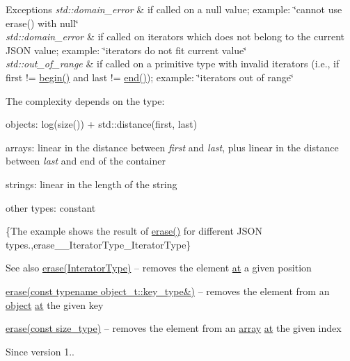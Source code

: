 \begin{DoxyExceptions}{Exceptions}
{\em std\+::domain\+\_\+error} & if called on a {\ttfamily null} value; example\+: {\ttfamily \char`\"{}cannot use
erase() with null\char`\"{}} \\
\hline
{\em std\+::domain\+\_\+error} & if called on iterators which does not belong to the current J\+S\+ON value; example\+: {\ttfamily \char`\"{}iterators do not fit current value\char`\"{}} \\
\hline
{\em std\+::out\+\_\+of\+\_\+range} & if called on a primitive type with invalid iterators (i.\+e., if {\ttfamily first != \hyperlink{a00025_ad4e381c54039607be08d7af41a1f6ad1}{begin()}} and {\ttfamily last != \hyperlink{a00025_a12ccf14d39ddae52f6c7e126105a230b}{end()}}); example\+: {\ttfamily \char`\"{}iterators out of range\char`\"{}}\\
\hline
\end{DoxyExceptions}
The complexity depends on the type\+:
\begin{DoxyItemize}
\item objects\+: {\ttfamily log(size()) + std\+::distance(first, last)}
\item arrays\+: linear in the distance between {\itshape first} and {\itshape last}, plus linear in the distance between {\itshape last} and end of the container
\item strings\+: linear in the length of the string
\item other types\+: constant
\end{DoxyItemize}

\{The example shows the result of {\ttfamily \hyperlink{a00025_a45e789042a23138eba2b69f34df9fc45}{erase()}} for different J\+S\+ON types.,erase\+\_\+\+\_\+\+Iterator\+Type\+\_\+\+Iterator\+Type\}

\begin{DoxySeeAlso}{See also}
\hyperlink{a00025_a45e789042a23138eba2b69f34df9fc45}{erase(\+Interator\+Type)} -- removes the element \hyperlink{a00025_a214a8c22d616fd3567b88932c07436c9}{at} a given position 

\hyperlink{a00025_aa36e72ffc3241b960fe9186d19e03bc3}{erase(const typename object\+\_\+t\+::key\+\_\+type\&)} -- removes the element from an \hyperlink{a00025_ad25b2f8c21e241e2d63455537a9294ff}{object} \hyperlink{a00025_a214a8c22d616fd3567b88932c07436c9}{at} the given key 

\hyperlink{a00025_a3da254c422ede5495f2815c5e48c00c5}{erase(const size\+\_\+type)} -- removes the element from an \hyperlink{a00025_a5685815624b086caa532f41e853d4b0f}{array} \hyperlink{a00025_a214a8c22d616fd3567b88932c07436c9}{at} the given index
\end{DoxySeeAlso}
\begin{DoxySince}{Since}
version 1.. 
\end{DoxySince}
